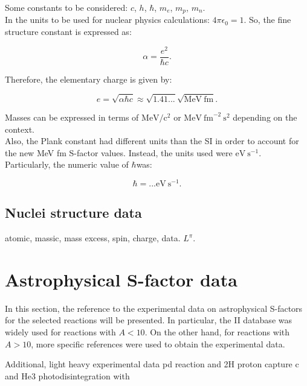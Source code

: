 \documentclass[openany]{book}
\begin{document}
Some constants to be considered: $c$, $h$, $\hbar$, $m_e$, $m_p$, $m_n$. \\

In the units to be used for nuclear physics calculations: $4\pi\epsilon_0 = 1$. So, the fine structure constant is expressed as:

\begin{equation} \label{eq:constants_alpha}
	\alpha = \frac{e^2}{\hbar c}.
\end{equation}

Therefore, the elementary charge is given by: 

\begin{equation} \label{eq:constants_e}
	e = \sqrt{\alpha\hbar c} \approx \sqrt{1.41...} \sqrt{\mathrm{MeV \ fm}}.
\end{equation}

Masses can be expressed in terms of $\mathrm{MeV/c^2}$ or $\mathrm{MeV \ {fm}^{-2} \ s^{2}}$ depending on the context.  \\ 

Also, the Plank constant had different units than the SI in order to account for the new MeV fm S-factor values. Instead, the units used were $\mathrm{eV \ {s}^{-1}}$. Particularly, the numeric value of $\hbar $was:

\begin{equation} \label{eq:constants_hbar}
	\hbar  =  ...  \mathrm{eV \ {s}^{-1}}.
\end{equation}

\subsection{Nuclei structure data} \label{sub:nucleiStructureData}

atomic, massic, mass excess, spin, charge, data. $L^{\pi}$.

\section{Astrophysical S-factor data} \label{sec:sfactorData}

In this section, the reference to the experimental data on astrophysical S-factors for the selected reactions will be presented. In particular, the  II database was widely used for reactions with $A < 10$. On the other hand, for reactions with $A > 10$, more specific references were used to obtain the experimental data.

Additional, light heavy experimental data pd reaction \cite{bystritsky_gerasimov_krylov_parzhitskii_dudkin_kaminskii_nechaev_padalko_petrov_mesyats_et_2008} and 2H proton capture c\cite{schmid_chasteler_laymon_weller_prior_tilley_1995} and He3 photodisintegration \cite{berman_koester_smith_1964} with \cite{warren_erdman_robertson_axen_macdonald_1963}
\end{document}

